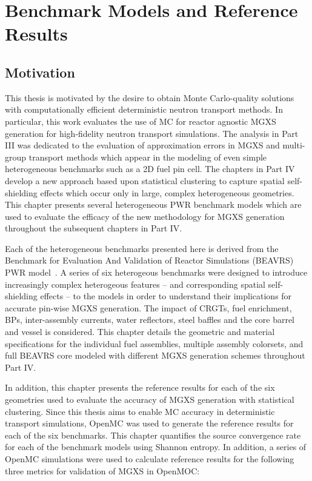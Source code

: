 \chapter{Benchmark Models and Reference Results}
\label{chap:benchmarks}

\section{Motivation}
\label{sec:chap7-motivate}

This thesis is motivated by the desire to obtain Monte Carlo-quality solutions with computationally efficient deterministic neutron transport methods. In particular, this work evaluates the use of \ac{MC} for reactor agnostic \ac{MGXS} generation for high-fidelity neutron transport simulations. The analysis in Part III was dedicated to the evaluation of approximation errors in \ac{MGXS} and multi-group transport methods which appear in the modeling of even simple heterogeneous benchmarks such as a 2D fuel pin cell. The chapters in Part IV develop a new approach based upon statistical clustering to capture spatial self-shielding effects which occur only in large, complex heterogeneous geometries. This chapter presents several heterogeneous \ac{PWR} benchmark models which are used to evaluate the efficacy of the new methodology for \ac{MGXS} generation throughout the subsequent chapters in Part IV.

Each of the heterogeneous benchmarks presented here is derived from the Benchmark for Evaluation And Validation of Reactor Simulations (BEAVRS) \ac{PWR} model~\cite{horelik2013beavrs}. A series of six heterogeous benchmarks were designed to introduce increasingly complex heterogeous features -- and corresponding spatial self-shielding effects -- to the models in order to understand their implications for accurate pin-wise \ac{MGXS} generation. The impact of \acp{CRGT}, fuel enrichment, \acp{BP}, inter-assembly currents, water reflectors, steel baffles and the core barrel and vessel is considered. This chapter details the geometric and material specifications for the individual fuel assemblies, multiple assembly colorsets, and full \ac{BEAVRS} core modeled with different \ac{MGXS} generation schemes throughout Part IV.

In addition, this chapter presents the reference results for each of the six geometries used to evaluate the accuracy of \ac{MGXS} generation with statistical clustering. Since this thesis aims to enable \ac{MC} accuracy in deterministic transport simulations, OpenMC was used to generate the reference results for each of the six benchmarks. This chapter quantifies the source convergence rate for each of the benchmark models using Shannon entropy. In addition, a series of OpenMC simulations were used to calculate reference results for the following three metrics for validation of \ac{MGXS} in OpenMOC:


